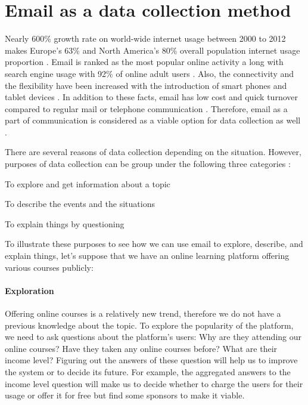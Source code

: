 \section{Email as a data collection method}
\label{sec:1:EmailDataCol}

Nearly 600\% growth rate on world-wide internet usage between 2000 to 2012 makes Europe's 63\% and North America's 80\% overall population internet usage proportion \citep{InternetWorldStats2012}. Email is ranked as the most popular online activity a long with search engine usage with 92\% of online adult users \citep{Purcell2011}. Also, the connectivity and the flexibility have been increased with the introduction of smart phones and tablet devices \citep{Madden2008}. In addition to these facts, email has low cost and quick turnover compared to regular mail or telephone communication \citep{Zikmund2007}. Therefore, email as a part of communication is considered as a viable option for data collection as well \citep{Zikmund2007}.
\vspace{1cm}

There are several reasons of data collection depending on the situation. However, purposes of data collection can be group under the following three categories \citep{Sue2011} \citep[pages 92--94]{Babbie2010}:

\begin{compactenum}
	\item To explore and get information about a topic
	\item To describe the events and the situations
	\item To explain things by questioning
\end{compactenum}

To illustrate these purposes to see how we can use email to explore, describe, and explain things, let's suppose that we have an online learning platform offering various courses publicly:

\paragraph{Exploration}
Offering online courses is a relatively new trend, therefore we do not have a previous knowledge about the topic. To explore the popularity of the platform, we need to ask questions about the platform's users: Why are they attending our online courses? Have they taken any online courses before? What are their income level? Figuring out the answers of these question will help us to improve the system or to decide its future. For example, the aggregated answers to the income level question will make us to decide whether to charge the users for their usage or offer it for free but find some sponsors to make it viable.

